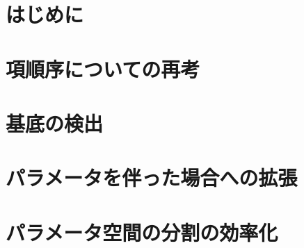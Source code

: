 





	
	

	\chapter{はじめに}\label{chapter01:chapter_num}
	
	\chapter{項順序についての再考}\label{chapter02:chapter_num}
	
	

	\chapter{\groebner{}基底の検出}\label{chapter03:chapter_num}

	\chapter{パラメータを伴った場合への拡張}\label{chapter04:chapter_num}

	\chapter{パラメータ空間の分割の効率化}\label{chapter05:chapter_num}


	

